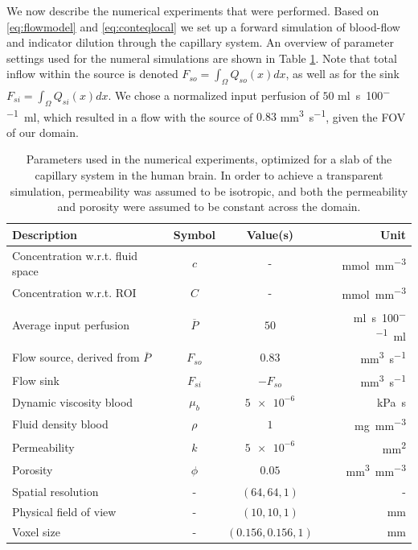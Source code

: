 \documentclass[paper=a4, fontsize=11pt,parskip=half,headings=small]{scrartcl}
\newcommand{\siFmm}{\milli\meter\cubed\per\second}
\newcommand{\siPml}{\milli\litre\per\second\per100\milli\litre}
\newcommand{\siJ}{\milli\mol\per\second\per\milli\meter\squared}
\newcommand{\sic}{\milli\mol\per\milli\meter\cubed}
\begin{document}
	We now describe the numerical experiments that were performed.
	Based on \eqref{eq:flowmodel} and \eqref{eq:conteqlocal} we set up a forward simulation of blood-flow and indicator dilution through the capillary system.
	An overview of parameter settings used for the numeral simulations are shown in Table \ref{tab:par}. Note that total inflow within the source is denoted $F_{so} = \int_\Omega Q_{so}(x) dx$, as well as for the sink $F_{si} = \int_\Omega Q_{si}(x) dx$. We chose a normalized input perfusion of $50$ \si{\siPml}, which resulted in a flow with the source of $0.83$ \si{\siFmm}, given the FOV of our domain.
	\begin{table}[H]
		\centering
	  \caption{Parameters used in the numerical experiments, optimized for a slab of the capillary system in the human brain. In order to achieve a transparent simulation, permeability was assumed to be isotropic, and both the permeability and porosity were assumed to be constant across the domain.}		
		\begin{tabular}{ l  c  c  r }
		    Description 									& Symbol 			& Value(s) 				& Unit 				\\
			\toprule
			Concentration w.r.t. fluid space				& $c$				& - 					& \si{\sic} 		\\
			Concentration w.r.t. ROI						& $C$				& - 					& \si{\sic} 		\\
		    Average input perfusion 				 		& $\overline{P}$ 	& $50$ 					& \si{\siPml}		\\
			Flow source, derived from $\overline{P}$ 		& $F_{so}$ 			& \num{0.83}			& \si{\cubic\milli\meter\per\second} \\
			Flow sink 										& $F_{si}$ 			& $-F_{so}$ 		 	& \si{\cubic\milli\meter\per\second}  		\\
			Dynamic viscosity blood \cite{rosencranz06} 	& $\mu_b$ 			& $\num{5e-6}$ 			& \si{\kilo\pascal\second}  	\\
			Fluid density blood \cite{kenner89} 			& $\rho$ 			& $\num{1}$				& \si{\milli\gram\per\cubic\milli\meter} 		\\		
			Permeability  									& $k$ 				& $\num{5e-6}$ 			& \si{\square\milli\meter} 			\\	
			Porosity\cite{wu03}								& $\phi$ 			& $0.05$ 				& \si{\cubic\milli\meter\per\cubic\milli\meter}	\\	
			Spatial resolution 								& - 				& $(64,64,1)$ 			& -					\\
			Physical field of view 								& - 				& $(10,10,1)$ 			& \si{\milli\meter}				\\
			Voxel size 										& - 				& $(0.156,0.156,1)$ 	& \si{\milli\meter}	\\
	  \end{tabular}
	  \label{tab:par}
	\end{table}	
	
\end{document}
